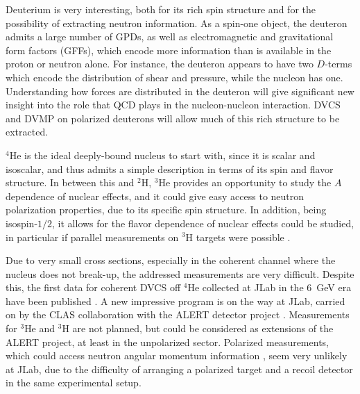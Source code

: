 
Deuterium is very interesting, both for its rich spin structure
and for the possibility of extracting neutron information.
As a spin-one object, the deuteron admits a large number of GPDs,
as well as electromagnetic and gravitational form factors (GFFs),
which encode more information than is available in the proton or neutron alone.
For instance, the deuteron appears to have two $D$-terms which encode
the distribution of shear and pressure, while the nucleon has one.
Understanding how forces are distributed in the deuteron
will give significant new insight into the role that QCD plays
in the nucleon-nucleon interaction. DVCS and DVMP on polarized deuterons
will allow much of this rich structure to be extracted.

$^4$He is the ideal deeply-bound nucleus to start with,
since it is scalar and isoscalar, and thus admits a simple
description in terms of its spin and flavor structure.
In between this and $^2$H, $^3$He provides an opportunity
to study the $A$ dependence of nuclear effects, and
it could give easy access to neutron polarization properties,
due to its specific spin structure.
In addition, being isospin-$1/2$, it allows for the
flavor dependence of nuclear effects could be studied, 
in particular if parallel measurements 
on $^3$H targets were possible \cite{Scopetta:2009sn}.

Due to very small cross sections,
especially in the coherent channel where the nucleus does not break-up,
the addressed measurements are very difficult.
Despite this, the first data for coherent DVCS off $^4$He
collected at JLab in the 6~GeV era
have been published \cite{Hattawy:2017woc}.
A new impressive program is on the way at JLab,
carried on by the CLAS collaboration with the ALERT detector project 
\cite{Armstrong:2017zqr,Armstrong:2017zcm,Armstrong:2017wfw}.
Measurements for $^3$He and $^3$H
are not planned, but could be considered
as extensions of the ALERT project, at least in the unpolarized 
sector. Polarized measurements, which could
access neutron angular momentum information \cite{Rinaldi:2012pj,
Rinaldi:2012ft,Rinaldi:2014bba}, seem
very unlikely at JLab, due to the difficulty of arranging
a polarized target and a recoil detector in the same experimental setup. 

